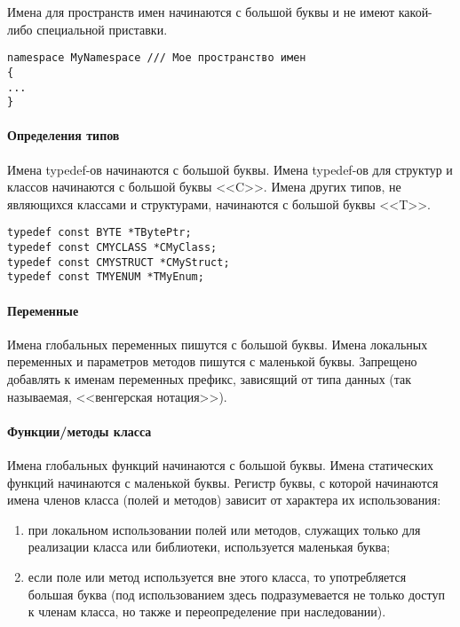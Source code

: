 Имена для пространств имен начинаются с большой буквы и не имеют какой-либо специальной приставки.

\begin{lstlisting}[frame=single]
namespace MyNamespace /// Мое пространство имен
{
...
}
\end{lstlisting}

\paragraph{Определения типов}

Имена typedef-ов начинаются с большой буквы. Имена typedef-ов для структур и классов начинаются с большой буквы <<C>>. Имена других типов, не являющихся классами и структурами, начинаются с большой буквы <<T>>.

\begin{lstlisting}[frame=single,numbers=none]
typedef const BYTE *TBytePtr;
typedef const CMYCLASS *CMyClass;
typedef const CMYSTRUCT *CMyStruct;
typedef const TMYENUM *TMyEnum;
\end{lstlisting}

\paragraph{Переменные}

Имена глобальных переменных пишутся с большой буквы. Имена локальных переменных и параметров методов пишутся с маленькой буквы. Запрещено добавлять к именам переменных префикс, зависящий от типа данных (так называемая, <<венгерская нотация>>).

\paragraph{Функции/методы класса}

Имена глобальных функций начинаются с большой буквы. Имена статических функций начинаются с маленькой буквы.
Регистр буквы, с которой начинаются имена членов класса (полей и методов) зависит от характера их использования:

\begin{enumerate}
\item при локальном использовании полей или методов, служащих только для реализации класса или библиотеки, используется маленькая буква;
\item если поле или метод используется вне этого класса, то употребляется большая буква (под использованием здесь подразумевается не только доступ к членам класса, но также и переопределение при наследовании).
\end{enumerate}

